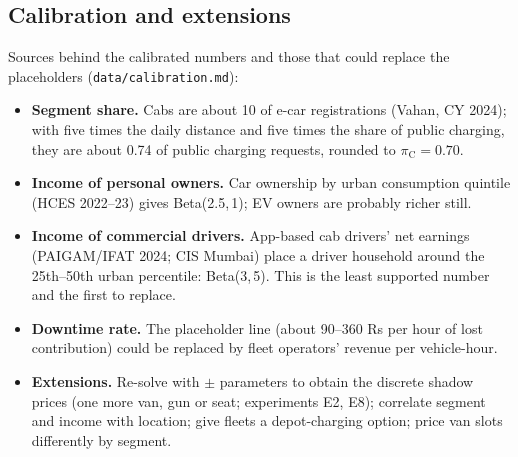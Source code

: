 \subsection{Calibration and extensions}
\label{sec:calibration}
Sources behind the calibrated numbers and those that could replace the placeholders (\texttt{data/calibration.md}):
\begin{itemize}
  \item \textbf{Segment share.} Cabs are about 10\pct{} of e-car registrations (Vahan, CY 2024); with five times the daily distance and five times the share of public charging, they are about 0.74 of public charging requests, rounded to $\pi_{\mathrm C}=0.70$.
  \item \textbf{Income of personal owners.} Car ownership by urban consumption quintile (HCES 2022--23) gives Beta(2.5,\,1); EV owners are probably richer still.
  \item \textbf{Income of commercial drivers.} App-based cab drivers' net earnings (PAIGAM/IFAT 2024; CIS Mumbai) place a driver household around the 25th--50th urban percentile: Beta(3,\,5). This is the least supported number and the first to replace.
  \item \textbf{Downtime rate.} The placeholder line (about 90--360 Rs per hour of lost contribution) could be replaced by fleet operators' revenue per vehicle-hour.
  \item \textbf{Extensions.} Re-solve with $\pm$ parameters to obtain the discrete shadow prices (one more van, gun or seat; experiments E2, E8); correlate segment and income with location; give fleets a depot-charging option; price van slots differently by segment.
\end{itemize}

